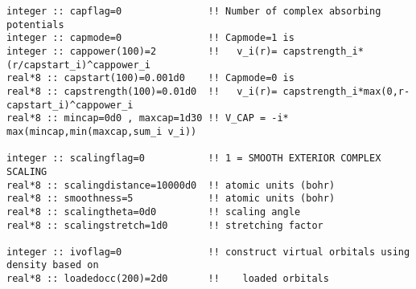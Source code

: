\begin{verbatim}
integer :: capflag=0               !! Number of complex absorbing potentials
integer :: capmode=0               !! Capmode=1 is 
integer :: cappower(100)=2         !!   v_i(r)= capstrength_i*(r/capstart_i)^cappower_i
real*8 :: capstart(100)=0.001d0    !! Capmode=0 is    
real*8 :: capstrength(100)=0.01d0  !!   v_i(r)= capstrength_i*max(0,r-capstart_i)^cappower_i
real*8 :: mincap=0d0 , maxcap=1d30 !! V_CAP = -i* max(mincap,min(maxcap,sum_i v_i))

integer :: scalingflag=0           !! 1 = SMOOTH EXTERIOR COMPLEX SCALING
real*8 :: scalingdistance=10000d0  !! atomic units (bohr)
real*8 :: smoothness=5             !! atomic units (bohr)
real*8 :: scalingtheta=0d0         !! scaling angle
real*8 :: scalingstretch=1d0       !! stretching factor

integer :: ivoflag=0               !! construct virtual orbitals using density based on 
real*8 :: loadedocc(200)=2d0       !!    loaded orbitals
\end{verbatim}
